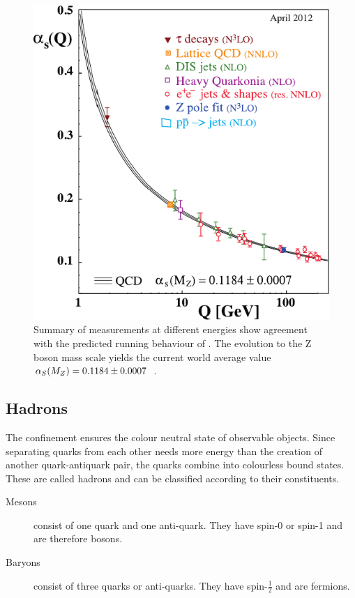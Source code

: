 \begin{figure}[ht]
	\centering
  \includegraphics[width=1.0\textwidth]{figures/sm_model/as_running.pdf}
 	\caption[Running of \as]{Summary of measurements at different energies show agreement with the predicted running behaviour of \as. The evolution to the Z boson mass scale yields the current world average value $\alpha_S(M_Z) = 0.1184\pm 0.0007$~\cite{Beringer:1900zz}.}
\end{figure}

\subsection{Hadrons}

The confinement ensures the colour neutral state of observable objects. Since separating quarks from each other needs more energy than the creation of another quark-antiquark pair, the quarks combine into colourless bound states. These are called hadrons and can be classified according to their constituents.

\begin{description}
\item[Mesons] consist of one quark and one anti-quark. They have spin-0 or spin-1 and are therefore bosons.
\item[Baryons] consist of three quarks or anti-quarks. They have spin-$\frac{1}{2}$ and are fermions.
\end{description}

